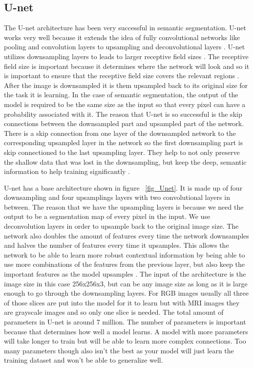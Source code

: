 \subsection{U-net}
%
The U-net architecture has been very successful in semantic segmentation. 
U-net works very well because it extends the idea of fully convolutional networks like pooling and convolution layers to upsampling and deconvolutional layers \cite{DBLP:journals/corr/RonnebergerFB15}. 
U-net utilizes downsampling layers to leads to larger receptive field sizes \cite{DBLP:journals/corr/LongSD14}. 
The receptive field size is important because it determines where the network will look and so it is important to ensure that the receptive field size covers the relevant regions \cite{NIPS2016_6203}.
After the image is downsampled it is them upsampled back to its original size for the task it is learning.
In the case of semantic segmentation, the output of the model is required to be the same size as the input so that every pixel can have a probability associated with it.
The reason that U-net is so successful is the skip connections between the downsampled part and upsampled part of the network.
There is a skip connection from one layer of the downsampled network to the corresponding upsampled layer in the network so the first downsampling part is skip connectioned to the last upsampling layer. 
They help to not only preserve the shallow data that was lost in the downsampling, but keep the deep, semantic information to help training significantly \cite{DBLP:journals/corr/LongSD14}.

U-net has a base architecture shown in figure ~\ref{fig_Unet}. 
It is made up of four downsampling and four upsamplings layers with two convolutional layers in between. 
The reason that we have the upsampling layers is because we need the output to be a segmentation map of every pixel in the input.
We use deconvolution layers in order to upsample back to the original image size. 
The network also doubles the amount of features every time the network downsamples and halves the number of features every time it upsamples. 
This allows the network to be able to learn more robust contextual information by being able to use more combinations of the features from the previous layer, but also keep the important features as the model upsamples \cite{DBLP:journals/corr/RonnebergerFB15}. 
The input of the architecture is the image size in this case 256x256x3, but can be any image size as long as it is large enough to go through the downsampling layers.
For RGB images usually all three of those slices are put into the model for it to learn but with MRI images they are grayscale images and so only one slice is needed. 
The total amount of parameters in U-net is around 7 million. 
The number of parameters is important because that determines how well a model learns. 
A model with more parameters will take longer to train but will be able to learn more complex connections. 
Too many parameters though also isn't the best as your model will just learn the training dataset and won't be able to generalize well. 

